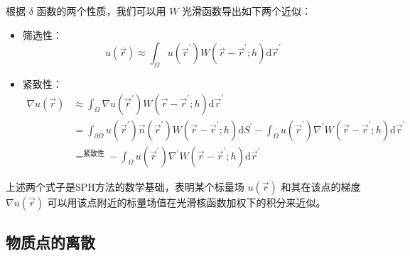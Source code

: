 \begin{frame}
    根据 $\delta$ 函数的两个性质，我们可以用 $W$ 光滑函数导出如下两个近似：

    \begin{itemize}
        \item 筛选性：
        \begin{equation}
            u(\vec{r})\approx \int_{\Omega} u(\vec{r}^\prime) 
            W(\vec{r} - \vec{r}^\prime;h) \mathrm{d}\vec{r}^\prime
        \end{equation}
        \item 紧致性：
        \begin{equation}
            \begin{aligned}
                \nabla u(\vec{r}) &\approx \int_{\Omega} \nabla u(\vec{r}^\prime)
                W(\vec{r} - \vec{r}^\prime;h) \mathrm{d}\vec{r}^\prime \\
                &=
                \int_{\partial\Omega} u(\vec{r}^\prime) \vec{n}(\vec{r}^\prime)
                W(\vec{r} - \vec{r}^\prime;h) \mathrm{d}S^\prime - 
                \int_{\Omega} u(\vec{r}^\prime) \nabla^\prime
                W(\vec{r} - \vec{r}^\prime;h) \mathrm{d}\vec{r}^\prime\\
                &\mathop{=}^{\text{紧致性}} -\int_{\Omega} u(\vec{r}^\prime) \nabla^\prime
                W(\vec{r} - \vec{r}^\prime;h) \mathrm{d}\vec{r}^\prime
            \end{aligned}
        \end{equation}
    \end{itemize}

    上述两个式子是SPH方法的数学基础，表明某个标量场 $u(\vec{r})$ 
    和其在该点的梯度 $\nabla u(\vec{r})$ 可以用该点附近的标量场值在光滑核函数加权下的积分来近似。
\end{frame}

\subsection{物质点的离散}

